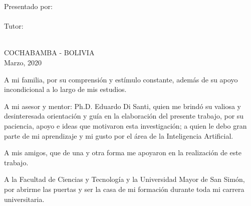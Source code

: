 \documentclass[11pt,spanish,singlespacing,headsepline]{MastersDoctoralThesis}
\begin{document}
\begin{titlepage}
\begin{center}
{\Large Presentado por:}\\

\hspace{ 0.50\textwidth} \Large{\authorname}\\

\hspace{ -0.16\textwidth} {\Large Tutor:}\\

\hspace{ 0.56\textwidth} {\Large{\supname}}\\

\hspace{ 0.35\textwidth} 
\end{center}

\vspace*{0.2cm}
 
\begin{center}
\vspace*{1.5cm}
\Large{COCHABAMBA - BOLIVIA}\hspace*{1cm}\Large{\\Marzo, 2020}	
\end{center}	
	
\end{titlepage}

\cleardoublepage


\begin{acknowledgements}
\addchaptertocentry{\acknowledgementname} 
\bigskip
A mi familia, por su comprensi\'{o}n y est\'{i}mulo constante, adem\'{a}s de su apoyo incondicional a lo largo de mis estudios.

\vspace{5mm} %

A mi asesor y mentor: Ph.D. Eduardo Di Santi, quien me brind\'{o} su valiosa y desinteresada orientaci\'{o}n y gu\'{i}a en la elaboraci\'{o}n del presente trabajo, por su paciencia, apoyo e ideas que motivaron esta investigaci\'{o}n; a quien le debo gran parte de mi aprendizaje y mi gusto por el \'{a}rea de la Inteligencia Artificial.

\vspace{5mm} %

A mis amigos, que de una y otra forma me apoyaron en la realizaci\'{o}n de este trabajo.

\vspace{5mm} %

A la Facultad de Ciencias y Tecnolog\'{i}a y la Universidad Mayor de San Sim\'{o}n, por abrirme las puertas y ser la casa de mi formaci\'{o}n durante toda mi carrera universitaria.

\end{acknowledgements}
\end{document}
